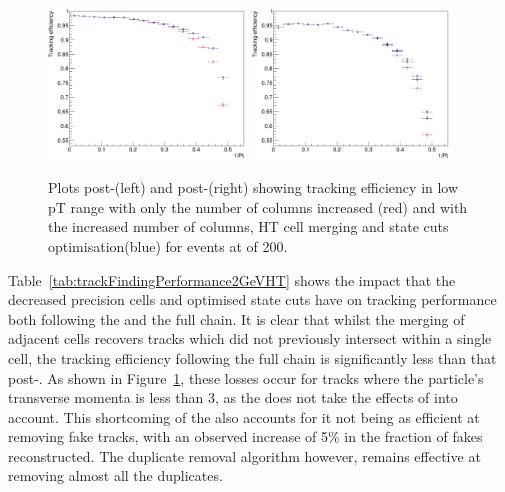 \begin{figure}[tbp]
\centering
\includegraphics[width=0.47\textwidth]{figs/tk-upgrade/results-lowPtTracking/htTrackingEffVsInvPtFlatGeometry_5000.pdf}
\includegraphics[width=0.47\textwidth]{figs/tk-upgrade/results-lowPtTracking/kfTrackingEffVsInvPtFlatGeometry_5000.pdf}
\caption{Plots post-\HT (left) and post-\KF (right) showing tracking efficiency in low pT range with only the number of \qpt columns increased (red) and with the increased number of columns, HT cell merging and \KF state cuts optimisation(blue) for \ttbar events at \PU of 200.
}
\label{fig:2GeVFlatEff}	
\end{figure}

Table~\ref{tab:trackFindingPerformance2GeVHT} shows the impact that the decreased precision \HT cells and optimised \KF state cuts have on tracking performance both following the \HT and the full chain.
It is clear that whilst the merging of adjacent \HT cells recovers  tracks which did not previously intersect within a single \HT cell, the tracking efficiency following the full chain is significantly less than that post-\HT.
As shown in Figure~\ref{fig:2GeVFlatEff}, these losses occur for tracks where the particle's transverse momenta is less than 3\GeV, as the \KF does not take the effects of \MS into account.
This shortcoming of the \KF also accounts for it not being as efficient at removing fake tracks, with an observed increase of 5\% in the fraction of fakes reconstructed.
The duplicate removal algorithm however, remains effective at removing almost all the duplicates.

